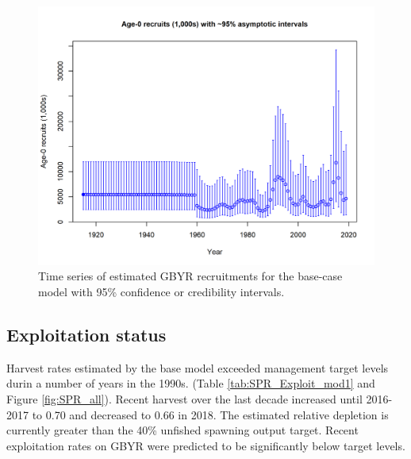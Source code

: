 \documentclass[12pt,]{article}
\begin{document}
\FloatBarrier

\begin{figure}
\centering
\includegraphics{r4ss/plots_mod1/ts11_Age-0_recruits_(1000s)_with_95_asymptotic_intervals.png}
\caption{Time series of estimated GBYR recruitments for the base-case
model with 95\% confidence or credibility intervals.
\label{fig:Recruits_all}}
\end{figure}

\FloatBarrier

\subsection*{Exploitation status}\label{exploitation-status}

Harvest rates estimated by the base model exceeded management target
levels durin a number of years in the 1990s. (Table
\ref{tab:SPR_Exploit_mod1} and Figure \ref{fig:SPR_all}). Recent harvest
over the last decade increased until 2016-2017 to 0.70 and decreased to
0.66 in 2018. The estimated relative depletion is currently greater than
the 40\% unfished spawning output target. Recent exploitation rates on
GBYR were predicted to be significantly below target levels.

\FloatBarrier
\end{document}

